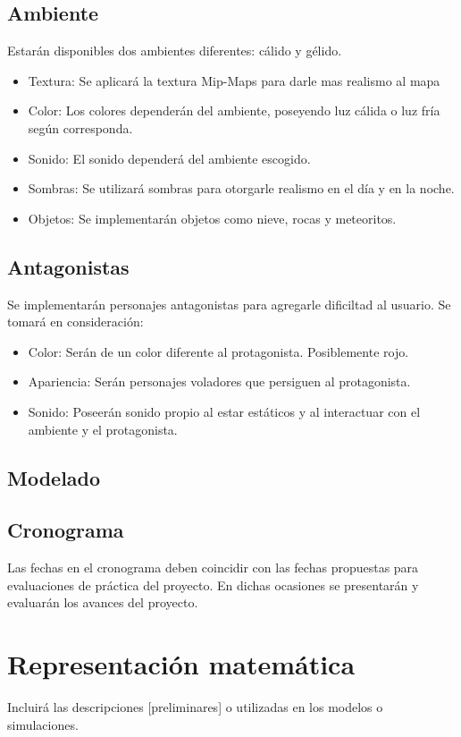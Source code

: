 \documentclass[a4paper]{article}
\begin{document}
\subsection{Ambiente}
Estarán disponibles dos ambientes diferentes: cálido y gélido.
\begin{itemize}
	\item Textura: Se aplicará la textura Mip-Maps para darle mas realismo al mapa
	\item Color: Los colores dependerán del ambiente, poseyendo luz cálida o luz fría según corresponda.
	\item Sonido: El sonido dependerá del ambiente escogido.
	\item Sombras: Se utilizará sombras para otorgarle realismo en el día y en la noche.
	\item Objetos: Se implementarán objetos como nieve, rocas y meteoritos.
	
\end{itemize}

\subsection{Antagonistas}
Se implementarán personajes antagonistas para agregarle dificiltad al usuario. Se tomará en consideración:
\begin{itemize}
	\item Color: Serán de un color diferente al protagonista. Posiblemente rojo.
	\item Apariencia: Serán personajes voladores que persiguen al protagonista.
	\item Sonido: Poseerán sonido propio al estar estáticos y al interactuar con el ambiente y el protagonista.
	
\end{itemize}

\subsection{Modelado}

\subsection{Cronograma}

Las fechas en el cronograma deben coincidir con las fechas propuestas para evaluaciones de práctica del proyecto. En dichas ocasiones se presentarán y evaluarán los avances del proyecto.

\section{Representación matemática}
Incluirá las descripciones [preliminares] o utilizadas en los
modelos o simulaciones.
\end{document}
